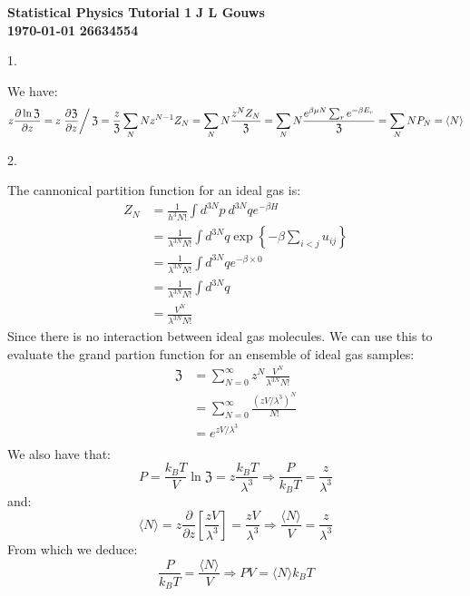\documentclass[a4paper,12pt]{article}
\newcommand\block[1]{\hspace*{#1}}
\begin{document}
\selectfont
{\Large \textbf{Statistical Physics Tutorial 1}} \hfill {\Large \textbf{J L Gouws}}\\
\block{1.0cm} {\large \textbf{\today}} \hfill {\large \textbf{26634554}}\\
\thispagestyle{empty}

1.
\begin{minipage}[t]{0.9\textwidth}
  We have:
  \begin{align*}
    z \frac{ \partial \ln \mathfrak{Z}}{\partial z} = z\left. \frac{\partial \mathfrak{Z}}{\partial z} \right/ \mathfrak{Z} = \frac{z}{\mathfrak{Z}} \sum_{N} N z^{N - 1} Z_N = \sum_{N} N \frac{z^{N} Z_N}{\mathfrak{Z}}= \sum_{N} N \frac{e^{\beta \mu N} \sum_re^{-\beta E_r}}{\mathfrak{Z}} = \sum_{N} N P_N = \langle N \rangle\\
  \end{align*}
\end{minipage}

2.
\begin{minipage}[t]{0.9\textwidth}
  The cannonical partition function for an ideal gas is:
  \begin{align*}
    Z_N &= \frac{1}{h^3N!} \int d^{3N}p_{\ } d^{3N}qe^{-\beta H}\\
        &= \frac{1}{\lambda^{3N}N!} \int d^{3N}q \exp\left\{-\beta \sum\limits_{i < j} u_{ij}\right\}\\
        &= \frac{1}{\lambda^{3N}N!} \int d^{3N}q e^{-\beta \times 0}\\
        &= \frac{1}{\lambda^{3N}N!} \int d^{3N}q \\
        &= \frac{V^N}{\lambda^{3N}N!}
  \end{align*}  
  Since there is no interaction between ideal gas molecules.
  We can use this to evaluate the grand partion function for an ensemble of ideal gas samples:
  \begin{align*}
    \mathfrak{Z} &= \sum_{N = 0}^\infty z^N \frac{V^N}{\lambda^{3N}N!}\\
                 &= \sum_{N = 0}^\infty \frac{(zV/\lambda^3)^N}{N!}\\
                 &= e^{zV/\lambda^3}\\
  \end{align*}
  We also have that:
  \begin{equation*}
    P = \frac{k_BT}{V} \ln \mathfrak{Z} = z\frac{k_BT}{\lambda^3} \Rightarrow \frac{P}{k_BT} = \frac{z}{\lambda^3}
  \end{equation*}
  and:
  \begin{equation*}
    \langle N\rangle = z \frac{\partial}{\partial z} \left[ \frac{zV}{\lambda^3} \right] = \frac{zV}{\lambda^3} \Rightarrow \frac{\langle N \rangle}{V} = \frac{z}{\lambda^3}
  \end{equation*}
  From which we deduce:
  \begin{equation*}
    \frac{P}{k_BT} = \frac{\langle N \rangle}{V} \Rightarrow PV = \langle N \rangle k_BT
  \end{equation*}
\end{minipage}
\end{document}
